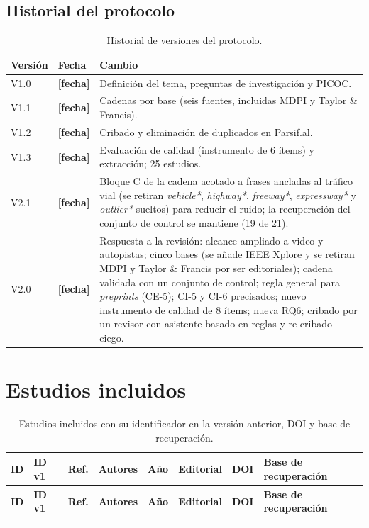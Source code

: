 \documentclass[12pt, a4paper]{article}
\newcommand{\pend}[1]{\textcolor{rojoAlerta}{\textbf{[#1]}}}
\begin{document}
\subsection*{Historial del protocolo}

\begin{table}[H]
\centering
\small
\caption{Historial de versiones del protocolo.}
\label{tab:historial}
\begin{tabularx}{\linewidth}{llY}
\toprule
\textbf{Versi\'{o}n} & \textbf{Fecha} & \textbf{Cambio} \\
\midrule
V1.0 & \pend{fecha} & Definici\'{o}n del tema, preguntas de investigaci\'{o}n y PICOC. \\
V1.1 & \pend{fecha} & Cadenas por base (seis fuentes, incluidas MDPI y Taylor \& Francis). \\
V1.2 & \pend{fecha} & Cribado y eliminaci\'{o}n de duplicados en Parsif.al. \\
V1.3 & \pend{fecha} & Evaluaci\'{o}n de calidad (instrumento de 6 \'{i}tems) y extracci\'{o}n; 25 estudios. \\
V2.1 & \pend{fecha} & Bloque C de la cadena acotado a frases ancladas al tr\'{a}fico vial (se retiran \textit{vehicle*}, \textit{highway*}, \textit{freeway*}, \textit{expressway*} y \textit{outlier*} sueltos) para reducir el ruido; la recuperaci\'{o}n del conjunto de control se mantiene (19 de 21). \\
V2.0 & \pend{fecha} & Respuesta a la revisi\'{o}n: alcance ampliado a video y autopistas; cinco bases (se a\~{n}ade IEEE Xplore y se retiran MDPI y Taylor \& Francis por ser editoriales); cadena validada con un conjunto de control; regla general para \textit{preprints} (CE-5); CI-5 y CI-6 precisados; nuevo instrumento de calidad de 8 \'{i}tems; nueva RQ6; cribado por un revisor con asistente basado en reglas y re-cribado ciego. \\
\bottomrule
\end{tabularx}
\end{table}

\section{Estudios incluidos}
\label{ap:estudios}

\begin{landscape}
\footnotesize
\begin{longtable}{lllP{2.8cm}cP{3.0cm}P{5.5cm}P{3.0cm}}
\caption{Estudios incluidos con su identificador en la versi\'{o}n anterior, DOI y base de recuperaci\'{o}n.\label{tab:ap_estudios}}\\
\toprule
\textbf{ID} & \textbf{ID v1} & \textbf{Ref.} & \textbf{Autores} & \textbf{A\~{n}o} & \textbf{Editorial} & \textbf{DOI} & \textbf{Base de recuperaci\'{o}n} \\
\midrule\endfirsthead
\toprule
\textbf{ID} & \textbf{ID v1} & \textbf{Ref.} & \textbf{Autores} & \textbf{A\~{n}o} & \textbf{Editorial} & \textbf{DOI} & \textbf{Base de recuperaci\'{o}n} \\
\midrule\endhead
\bottomrule\endfoot
{}
\end{longtable}
\end{landscape}
\end{document}
